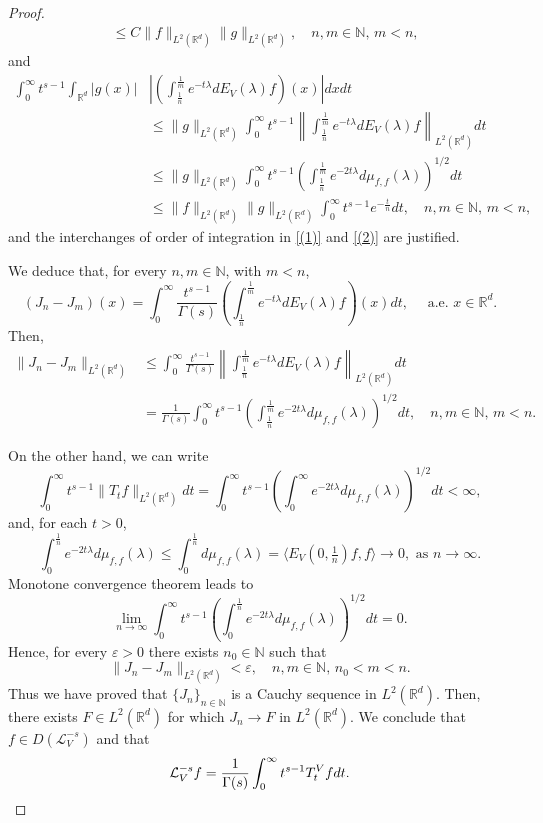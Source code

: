 \documentclass[10pt, a4paper, reqno]{amsart}
\theoremstyle{definition}
\theoremstyle{remark}
\numberwithin{equation}{section}
\begin{document}
\begin{proof}
\begin{align*}
&\leq C\|f\|_{L^2(\mathbb R^d)}\|g\|_{L^2(\mathbb R^d)},\quad n,m\in \mathbb N,\,m<n,
\end{align*}
and
\begin{align*}
    \int_0^\infty t^{s -1}\int_{\mathbb R^d}|g(x)|&\left|\left(\int_{\frac{1}{n}}^{\frac{1}{m}}e^{-t\lambda}dE_V(\lambda )f\right)(x)\right|dxdt&\\
    &\leq  \|g\|_{L^2(\mathbb R^d)}\int_0^\infty t^{s-1}\left\|\int_{\frac{1}{n}}^{\frac{1}{m}}e^{-t\lambda}dE_V(\lambda )f\right\|_{L^2(\mathbb R^d)}dt\\
    &\leq \|g\|_{L^2(\mathbb R^d)}\int_0^\infty t^{s -1}\left(\int_{\frac{1}{n}}^{\frac{1}{m}}e^{-2t\lambda}d\mu _{f,f}(\lambda)\right)^{1/2}dt\\
    &\leq \|f\|_{L^2(\mathbb R^d)}\|g\|_{L^2(\mathbb R^d)}\int_0^\infty t^{s -1}e^{-\frac{t}{n}}dt,\quad n,m\in \mathbb N,\,m<n,
\end{align*}
and the interchanges of order of integration in \eqref{(1)} and \eqref{(2)} are justified. 

We deduce that, for every $n,m\in \mathbb N$, with $m<n$,
\[
(J_n-J_m)(x)=\int_0^\infty \frac{t^{s -1}}{\Gamma (s)}\left(\int_{\frac{1}{n}}^{\frac{1}{m}} e^{-t\lambda}dE_V(\lambda)f\right)(x)dt,\quad \text{ a.e. }x\in \mathbb R^d.
\]
Then,
\begin{align*}
\|J_n-J_m\|_{L^2(\mathbb R^d)}&\leq \int_0^\infty \frac{t^{s -1}}{\Gamma (s)}\left\|\int_{\frac{1}{n}}^{\frac{1}{m}} e^{-t\lambda}dE_V(\lambda)f\right\|_{L^2(\mathbb R^d)}dt\\
&=\frac{1}{\Gamma (s)}\int_0^\infty t^{s-1}\left(\int_{\frac{1}{n}}^{\frac{1}{m}} e^{-2t\lambda}d\mu _{f,f}(\lambda)\right)^{1/2}dt,\quad n,m\in \mathbb N,\,m<n.
\end{align*}

On the other hand, we can write
\[
\int_0^\infty t^{s -1}\|T_tf\|_{L^2(\mathbb R^d)}dt=\int_0^\infty t^{s -1}\left(\int_0^\infty e^{-2t\lambda}d\mu _{f,f}(\lambda)\right)^{1/2}dt<\infty,
\]
and, for each $t>0$,
\[
\int_0^{\frac{1}{n}}e^{-2t\lambda}d\mu _{f,f}(\lambda)\leq \int_0^{\frac{1}{n}}d\mu _{f,f}(\lambda)=\langle E_V(0,\tfrac{1}{n})f,f\rangle \longrightarrow 0,\mbox{ as }n\rightarrow \infty.
\]
Monotone convergence theorem leads to 
\[
\lim_{n\rightarrow \infty }\int_0^\infty t^{s -1}\left(\int_0^{\frac{1}{n}}e^{-2t\lambda}d\mu _{f,f}(\lambda)\right)^{1/2}dt=0.
\]
Hence, for every $\varepsilon >0$ there exists $n_0\in \mathbb N$ such that
\[
\|J_n-J_m\|_{L^2(\mathbb R^d)}<\varepsilon,\quad n,m\in \mathbb N,\,n_0<m<n.
\]
Thus we have proved that $\{J_n\}_{n\in \mathbb N}$ is a Cauchy sequence in $L^2(\mathbb R^d)$. Then, there exists $F\in L^2(\mathbb R^d)$ for which $J_n\longrightarrow F$ in $L^2(\mathbb R^d)$. We conclude that $f\in D(\mathcal L_V^{-s})$ and that
\[
\mathcal L_V^{-s}f=\frac{1}{\Gamma (s )}\int_0^\infty t^{s -1}T_t^Vfdt.\qedhere
\]
\end{proof}
\end{document}
